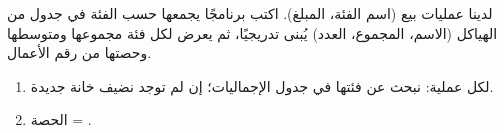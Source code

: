 \begin{statement}
لدينا  عمليات بيع (اسم الفئة، المبلغ). اكتب برنامجًا يجمعها حسب الفئة في جدول من الهياكل  (الاسم، المجموع، العدد) يُبنى تدريجيًا، ثم يعرض لكل فئة مجموعها ومتوسطها وحصتها من رقم الأعمال.
\end{statement}
\begin{stepsbox}\begin{enumerate}
\item لكل عملية: نبحث عن فئتها في جدول الإجماليات؛ إن لم توجد نضيف خانة جديدة.
\item الحصة = .
\end{enumerate}\end{stepsbox}

